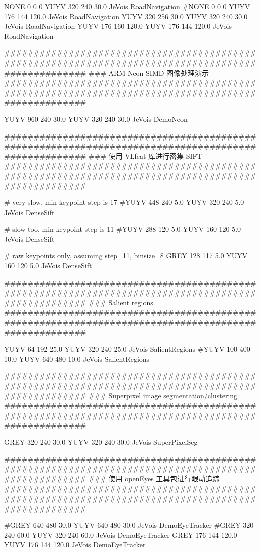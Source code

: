 \begin{DoxyVerb}
NONE 0 0 0 YUYV 320 240 30.0 JeVois RoadNavigation
#NONE 0 0 0 YUYV 176 144 120.0 JeVois RoadNavigation
YUYV 320 256 30.0 YUYV 320 240 30.0 JeVois RoadNavigation
YUYV 176 160 120.0 YUYV 176 144 120.0 JeVois RoadNavigation

#################################################################################################### 
### ARM-Neon SIMD 图像处理演示 
####################################################################################################

YUYV 960 240 30.0 YUYV 320 240 30.0 JeVois DemoNeon

####################################################################################################
### 使用 VLfeat 库进行密集 SIFT 
####################################################################################################

# very slow, min keypoint step is 17
#YUYV 448 240 5.0 YUYV 320 240 5.0 JeVois DenseSift

# slow too, min keypoint step is 11
#YUYV 288 120 5.0 YUYV 160 120 5.0 JeVois DenseSift

# raw keypoints only, assuming step=11, binsize=8
GREY 128 117 5.0 YUYV 160 120 5.0 JeVois DenseSift

####################################################################################################
### Salient regions
####################################################################################################

YUYV 64 192 25.0 YUYV 320 240 25.0 JeVois SalientRegions
#YUYV 100 400 10.0 YUYV 640 480 10.0 JeVois SalientRegions

####################################################################################################
### Superpixel image segmentation/clustering
####################################################################################################

GREY 320 240 30.0 YUYV 320 240 30.0 JeVois SuperPixelSeg

####################################################################################################
### 使用 openEyes 工具包进行眼动追踪 
####################################################################################################

#GREY 640 480 30.0 YUYV 640 480 30.0 JeVois DemoEyeTracker
#GREY 320 240 60.0 YUYV 320 240 60.0 JeVois DemoEyeTracker
GREY 176 144 120.0 YUYV 176 144 120.0 JeVois DemoEyeTracker


\end{DoxyVerb}
